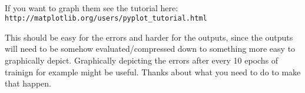 \documentclass[a4paper,10pt]{article}
\begin{document}
\ \\

If you want to graph them see the tutorial here:
\ \\
\texttt{http://matplotlib.org/users/pyplot\_tutorial.html}

This should be easy for the errors and harder for the outputs, since the outputs will need to be somehow evaluated/compressed down to something more easy to graphically depict. Graphically depicting the errors after every 10 epochs of trainign for example might be useful. Thanks about what you need to do to make that happen.
\end{document}
